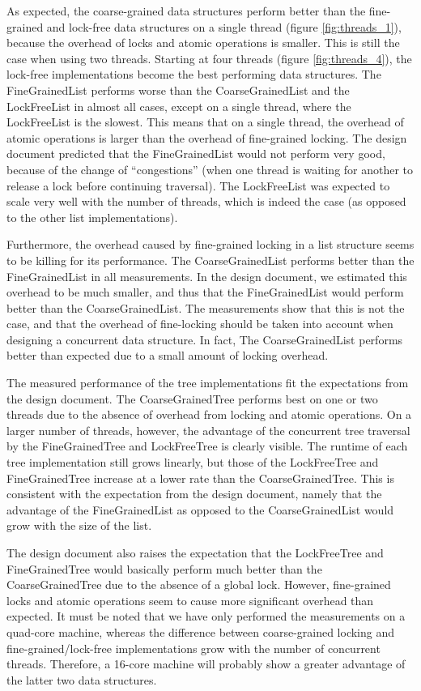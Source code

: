 \documentclass[a4paper]{article}
\begin{document}
As expected, the coarse-grained data structures perform better than the
fine-grained and lock-free data structures on a single thread (figure
\ref{fig:threads_1}), because the overhead of locks and atomic operations is
smaller. This is still the case when using two threads. Starting at four
threads (figure \ref{fig:threads_4}), the lock-free implementations become the
best performing data structures. The FineGrainedList performs worse than the
CoarseGrainedList and the LockFreeList in almost all cases, except on a single
thread, where the LockFreeList is the slowest. This means that on a single
thread, the overhead of atomic operations is larger than the overhead of
fine-grained locking. The design document predicted that the FineGrainedList
would not perform very good, because of the change of ``congestions'' (when one
thread is waiting for another to release a lock before continuing traversal).
The LockFreeList was expected to scale very well with the number of threads,
which is indeed the case (as opposed to the other list implementations).

Furthermore, the overhead caused by fine-grained locking in a list structure
seems to be killing for its performance. The CoarseGrainedList performs better
than the FineGrainedList in all measurements. In the design document, we
estimated this overhead to be much smaller, and thus that the FineGrainedList
would perform better than the CoarseGrainedList. The measurements show that
this is not the case, and that the overhead of fine-locking should be taken
into account when designing a concurrent data structure. In fact, The
CoarseGrainedList performs better than expected due to a small amount of
locking overhead.

The measured performance of the tree implementations fit the expectations from
the design document. The CoarseGrainedTree performs best on one or two threads
due to the absence of overhead from locking and atomic operations. On a larger
number of threads, however, the advantage of the concurrent tree traversal by
the FineGrainedTree and LockFreeTree is clearly visible. The runtime of each
tree implementation still grows linearly, but those of the LockFreeTree and
FineGrainedTree increase at a lower rate than the CoarseGrainedTree. This is
consistent with the expectation from the design document, namely that the
advantage of the FineGrainedList as opposed to the CoarseGrainedList would grow
with the size of the list.

The design document also raises the expectation that the LockFreeTree and
FineGrainedTree would basically perform much better than the CoarseGrainedTree
due to the absence of a global lock. However, fine-grained locks and atomic
operations seem to cause more significant overhead than expected. It must be
noted that we have only performed the measurements on a quad-core machine,
whereas the difference between coarse-grained locking and
fine-grained/lock-free implementations grow with the number of concurrent
threads. Therefore, a 16-core machine will probably show a greater advantage of
the latter two data structures.
\end{document}

